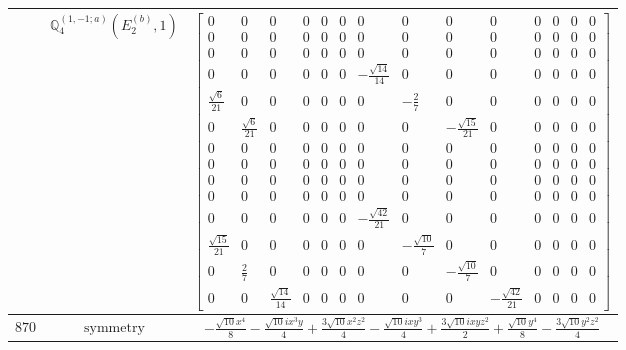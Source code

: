 \documentclass[fleqn,8pt,landscape]{jsarticle}
\begin{document}
\begin{longtable}{ccc}
$  $ & $ \mathbb{Q}_{4}^{(1,-1;a)}(E_{2}^{(b)},1) $ & $ \begin{bmatrix} 0 & 0 & 0 & 0 & 0 & 0 & 0 & 0 & 0 & 0 & 0 & 0 & 0 & 0 \\ 0 & 0 & 0 & 0 & 0 & 0 & 0 & 0 & 0 & 0 & 0 & 0 & 0 & 0 \\ 0 & 0 & 0 & 0 & 0 & 0 & 0 & 0 & 0 & 0 & 0 & 0 & 0 & 0 \\ 0 & 0 & 0 & 0 & 0 & 0 & - \frac{\sqrt{14}}{14} & 0 & 0 & 0 & 0 & 0 & 0 & 0 \\ \frac{\sqrt{6}}{21} & 0 & 0 & 0 & 0 & 0 & 0 & - \frac{2}{7} & 0 & 0 & 0 & 0 & 0 & 0 \\ 0 & \frac{\sqrt{6}}{21} & 0 & 0 & 0 & 0 & 0 & 0 & - \frac{\sqrt{15}}{21} & 0 & 0 & 0 & 0 & 0 \\ 0 & 0 & 0 & 0 & 0 & 0 & 0 & 0 & 0 & 0 & 0 & 0 & 0 & 0 \\ 0 & 0 & 0 & 0 & 0 & 0 & 0 & 0 & 0 & 0 & 0 & 0 & 0 & 0 \\ 0 & 0 & 0 & 0 & 0 & 0 & 0 & 0 & 0 & 0 & 0 & 0 & 0 & 0 \\ 0 & 0 & 0 & 0 & 0 & 0 & 0 & 0 & 0 & 0 & 0 & 0 & 0 & 0 \\ 0 & 0 & 0 & 0 & 0 & 0 & - \frac{\sqrt{42}}{21} & 0 & 0 & 0 & 0 & 0 & 0 & 0 \\ \frac{\sqrt{15}}{21} & 0 & 0 & 0 & 0 & 0 & 0 & - \frac{\sqrt{10}}{7} & 0 & 0 & 0 & 0 & 0 & 0 \\ 0 & \frac{2}{7} & 0 & 0 & 0 & 0 & 0 & 0 & - \frac{\sqrt{10}}{7} & 0 & 0 & 0 & 0 & 0 \\ 0 & 0 & \frac{\sqrt{14}}{14} & 0 & 0 & 0 & 0 & 0 & 0 & - \frac{\sqrt{42}}{21} & 0 & 0 & 0 & 0 \end{bmatrix} $ \\ \hline
$ 870 $ & $ \text{symmetry} $ & $ - \frac{\sqrt{10} x^{4}}{8} - \frac{\sqrt{10} i x^{3} y}{4} + \frac{3 \sqrt{10} x^{2} z^{2}}{4} - \frac{\sqrt{10} i x y^{3}}{4} + \frac{3 \sqrt{10} i x y z^{2}}{2} + \frac{\sqrt{10} y^{4}}{8} - \frac{3 \sqrt{10} y^{2} z^{2}}{4} $ \\

\end{longtable}
\end{document}

